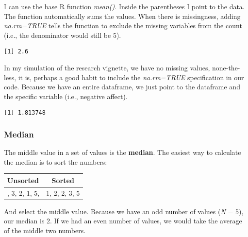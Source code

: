 \documentclass[
  11pt,
]{book}
\newenvironment{Shaded}{\begin{snugshade}}{\end{snugshade}}
\newcommand{\AttributeTok}[1]{\textcolor[rgb]{0.27,0.27,0.27}{#1}}
\newcommand{\ConstantTok}[1]{\textcolor[rgb]{0.37,0.37,0.37}{#1}}
\newcommand{\FunctionTok}[1]{\textcolor[rgb]{0.27,0.27,0.27}{\textbf{#1}}}
\newcommand{\NormalTok}[1]{#1}
\newcommand{\SpecialCharTok}[1]{\textcolor[rgb]{0.43,0.43,0.43}{\textbf{#1}}}
\begin{document}
I can use the base R function \emph{mean()}. Inside the parentheses I point to the data. The function automatically sums the values. When there is missingness, adding \emph{na.rm=TRUE} tells the function to exclude the missing variables from the count (i.e., the denominator would still be 5).

\begin{Shaded}
\end{Shaded}

\begin{verbatim}
[1] 2.6
\end{verbatim}

In my simulation of the research vignette, we have no missing values, none-the-less, it is, perhaps a good habit to include the \emph{na.rm=TRUE} specification in our code. Because we have an entire dataframe, we just point to the dataframe and the specific variable (i.e., negative affect).

\begin{Shaded}
\end{Shaded}

\begin{verbatim}
[1] 1.813748
\end{verbatim}

\hypertarget{median}{%
\subsubsection{Median}\label{median}}

The middle value in a set of values is the \textbf{median}. The easiest way to calculate the median is to sort the numbers:

\begin{longtable}[]{@{}lc@{}}
\toprule\noalign{}
Unsorted & Sorted \\
\midrule\noalign{}
\endhead
\bottomrule\noalign{}
\endlastfoot
2, 3, 2, 1, 5, & 1, 2, 2, 3, 5 \\
\end{longtable}

And select the middle value. Because we have an odd number of values (\emph{N} = 5), our median is 2. If we had an even number of values, we would take the average of the middle two numbers.
\end{document}
